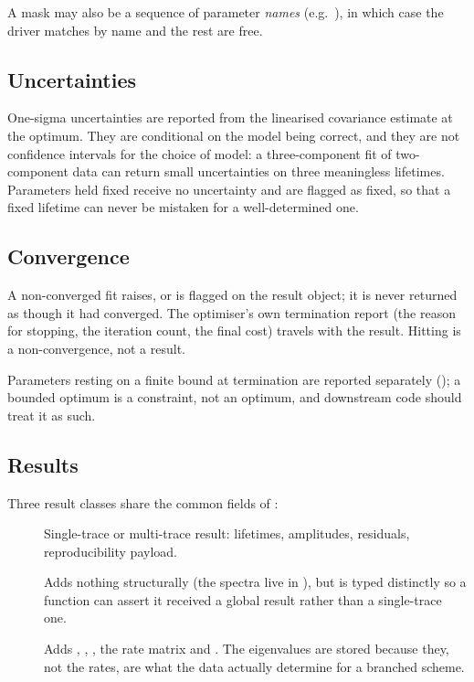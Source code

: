 A  mask may also be a sequence of parameter \emph{names}
(e.g.\ \code{["tau1", "t0"]}), in which case the driver matches by name and
the rest are free.

\subsection{Uncertainties}

One-sigma uncertainties are reported from the linearised covariance estimate at
the optimum. They are conditional on the model being correct, and they are not
confidence intervals for the choice of model: a three-component fit of
two-component data can return small uncertainties on three meaningless
lifetimes. Parameters held fixed receive no uncertainty and are flagged as
fixed, so that a fixed lifetime can never be mistaken for a well-determined
one.

\subsection{Convergence}\label{sec:convergence}

A non-converged fit raises, or is flagged on the result object; it is never
returned as though it had converged. The optimiser's own termination report
(the reason for stopping, the iteration count, the final cost) travels with the
result. Hitting  is a non-convergence, not a result.

Parameters resting on a finite bound at termination are reported separately
(); a bounded optimum is a constraint, not an
optimum, and downstream code should treat it as such.

\subsection{Results}\label{sec:results}

Three result classes share the common fields of :

\begin{description}
  \item[] Single-trace or multi-trace result: lifetimes,
    amplitudes, residuals, reproducibility payload.
  \item[] Adds nothing structurally (the spectra live in
    ), but is typed distinctly so a function can assert it received
    a global result rather than a single-trace one.
  \item[] Adds , ,
    , the rate matrix  and .
    The eigenvalues are stored because they, not the rates, are what the data
    actually determine for a branched scheme.
\end{description}


